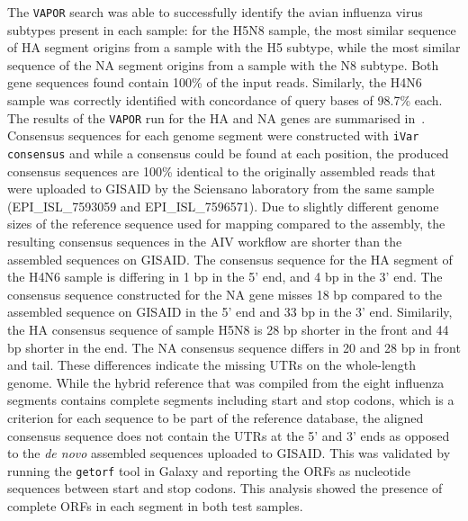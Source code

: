 The \texttt{VAPOR} search was able to successfully identify the avian influenza virus subtypes present in each sample: for the H5N8 sample, the most similar sequence of \ac{HA} segment origins from a sample with the H5 subtype, while the most similar sequence of the \ac{NA} segment origins from a sample with the N8 subtype. Both gene sequences found contain 100\% of the input reads. Similarly, the H4N6 sample was correctly identified with concordance of query bases of 98.7\% each. The results of the \texttt{VAPOR} run for the \ac{HA} and \ac{NA} genes are summarised in~. \\
Consensus sequences for each genome segment were constructed with \texttt{iVar consensus} and while a consensus could be found at each position, the produced consensus sequences are 100\% identical to the originally assembled reads that were uploaded to \ac{GISAID} by the Sciensano laboratory from the same sample (EPI\_ISL\_7593059 and EPI\_ISL\_7596571). Due to slightly different genome sizes of the reference sequence used for mapping compared to the assembly, the resulting consensus sequences in the \ac{AIV} workflow are shorter than the assembled sequences on \ac{GISAID}. The consensus sequence for the \ac{HA} segment of the H4N6 sample is differing in 1 bp in the 5' end, and 4 bp in the 3' end. The consensus sequence constructed for the \ac{NA} gene misses 18 bp compared to the assembled sequence on \ac{GISAID} in the 5' end and 33 bp in the 3' end. Similarily, the \ac{HA} consensus sequence of sample H5N8 is 28 bp shorter in the front and 44 bp shorter in the end. The \ac{NA} consensus sequence differs in 20 and 28 bp in front and tail. These differences indicate the missing \acp{UTR} on the whole-length genome. While the hybrid reference that was compiled from the eight influenza segments contains complete segments including start and stop codons, which is a criterion for each sequence to be part of the reference database, the aligned consensus sequence does not contain the \acp{UTR} at the 5' and 3' ends as opposed to the \textit{de novo} assembled sequences uploaded to \ac{GISAID}. This was validated by running the \texttt{getorf} tool in Galaxy and reporting the \acp{ORF} as nucleotide sequences between start and stop codons. This analysis showed the presence of complete \acp{ORF} in each segment in both test samples.\\
